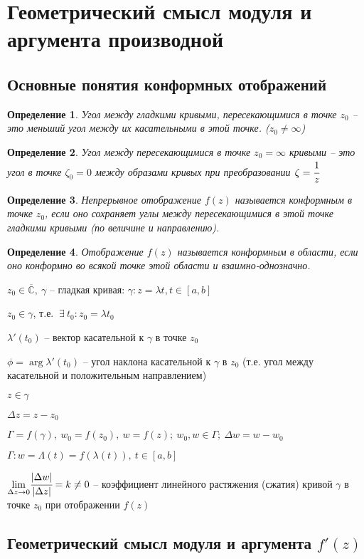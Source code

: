 \documentclass[draft]{article}
\renewcommand{\C}{\mathbb{C}}
\newcommand{\mlim}[1]{\underset{#1}{\lim}}
\renewcommand{\bar}{\overline}
\newcommand{\g}{\gamma}
\renewcommand{\f}{\phi}
\renewcommand{\l}{\lambda}
\newcommand{\D}{\Delta}
\newcommand{\E}{\ \exists}
\newcommand{\CC}{\bar{\C}}
\newcommand{\opr}[1]{\begin{opred}#1\end{opred}}
\newtheorem*{opred}{Определение}
\theoremstyle{remark}
\begin{document}

\section{Геометрический смысл модуля и аргумента производной}

\subsection{Основные понятия конформных отображений}

\opr{Угол между гладкими кривыми, пересекающимися в точке $z_0$ -- это меньший угол между их касательными в этой точке. ($z_0\neq\infty$)}

\opr{Угол между пересекающимися в точке $z_0=\infty$ кривыми -- это угол в точке $\zeta_0=0$ между образами кривых при преобразовании $\zeta=\cfrac1z$}

\opr{Непрерывное отображение $f(z)$ называется конформным в точке $z_0$, если оно сохраняет углы между пересекающимися в этой точке гладкими кривыми (по величине и направлению).}

\opr{Отображение $f(z)$ называется конформным в области, если оно конформно во всякой точке этой области и взаимно-однозначно.}

$z_0\in\CC,\ \gamma$ -- гладкая кривая: $\gamma\colon z=\lambda{t},t\in[a,b]$

$z_0\in\gamma$, т.е. $\E\ t_0\colon z_0=\lambda{t_0}$

$\lambda'(t_0)$ -- вектор касательной к $\gamma$ в точке $z_0$

$\f=\arg \l'(t_0)$ -- угол наклона касательной к $\g$ в $z_0$ (т.е. угол между касательной и положительным направлением)

$z\in\g$

$\D z=z-z_0$

$\Gamma=f(\gamma),\ w_0=f(z_0),\ w=f(z);\ w_0,w\in\Gamma;\ \D w=w-w_0$

$\Gamma\colon w=\Lambda(t)=f(\l(t)),\ t\in[a,b]$

$\mlim{\D z\to0}\cfrac{|\D w|}{|\D z|}=k\neq0$ -- коэффициент линейного растяжения (сжатия) кривой $\g$ в точке $z_0$ при отображении $f(z)$

\subsection{Геометрический смысл модуля и аргумента $f'(z)$}
\end{document}
